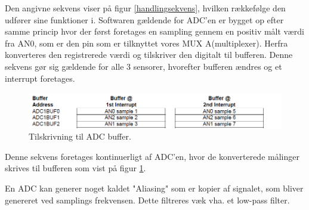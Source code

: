 Den angivne sekvens viser på figur \ref{handlingsekvens}, hvilken rækkefølge den udfører sine funktioner i. Softwaren gældende for ADC'en er bygget op efter samme princip hvor der først foretages en sampling gennem en positiv målt værdi fra AN0, som er den pin som er tilknyttet vores MUX A(multiplexer). Herfra konverteres den registrerede værdi og tilskriver den digitalt til bufferen. Denne sekvens gør sig gældende for alle 3 sensorer, hvorefter bufferen ændres og et interrupt foretages. 

\begin{figure}[h!]
  \centering
  \includegraphics[width=1.1\textwidth]{figures/adcBuffer.png}
  \caption{Tilskrivning til ADC buffer.}
  \label{adcBuffer}
\end{figure}

Denne sekvens foretages kontinuerligt af ADC'en, hvor de konverterede målinger skrives til bufferen som vist på figur \ref{adcBuffer}. 







En ADC kan generer noget kaldet "Aliasing" som er kopier af signalet, som bliver genereret ved samplings frekvensen. Dette filtreres væk vha. et low-pass filter.